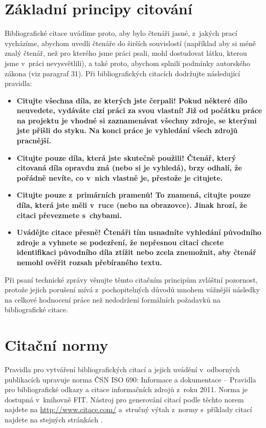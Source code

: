 \section{Základní principy citování}

Bibliografické citace uvádíme proto, aby bylo čtenáři jasné, z~jakých prací vycházíme, abychom uvedli čtenáře do širších souvislostí (například aby si méně znalý čtenář, než pro kterého jsme práci psali, mohl dostudovat látku, kterou jsme v~práci nevysvětlili), a také proto, abychom splnili podmínky autorského zákona (viz paragraf 31). Při bibliografických citacích dodržujte následující pravidla:

\begin{itemize}
  \item{\bf Citujte všechna díla, ze kterých jste čerpali! \rm Pokud některé dílo neuvedete, vydáváte cizí práci za svou vlastní! Již od počátku práce na projektu je vhodné si zaznamenávat všechny zdroje, se kterými jste přišli do styku. Na konci práce je vyhledání všech zdrojů pracnější.}
  \item{\bf Citujte pouze díla, která jste skutečně použili! \rm Čtenář, který citovaná díla opravdu zná (nebo si je vyhledá), brzy odhalí, že pořádně nevíte, co v~nich vlastně je, přestože je citujete.}
  \item{\bf Citujte pouze z~primárních pramenů! \rm To znamená, citujte pouze díla, která jste měli v~ruce (nebo na obrazovce). Jinak hrozí, že citaci převezmete s~chybami.}
  \item{\bf Uvádějte citace přesně! \rm Čtenáři tím usnadníte vyhledání původního zdroje a vyhnete se podezření, že nepřesnou citací chcete identifikaci původního díla ztížit nebo zcela znemožnit, aby čtenář nemohl ověřit rozsah přebíraného textu.} 
\end{itemize}

Při psaní technické zprávy věnujte těmto citačním principům zvláštní pozornost, protože jejich porušení mívá z~pochopitelných důvodů mnohem vážnější následky na celkové hodnocení práce než nedodržení formálních požadavků na bibliografické citace.

\section{Citační normy}

Pravidla pro vytváření bibliografických citací a jejich uvádění v~odborných publikacích upravuje norma ČSN ISO 690: Informace a dokumentace -- Pravidla pro bibliografické odkazy a citace informačních zdrojů z~roku 2011. Norma je dostupná v~knihovně FIT. Nástroj pro generování citací podle těchto norem najdete na \url{http://www.citace.com/} a~stručný výtah z~normy s~příklady citací najdete na stejných stránkách \cite{biblio}.

